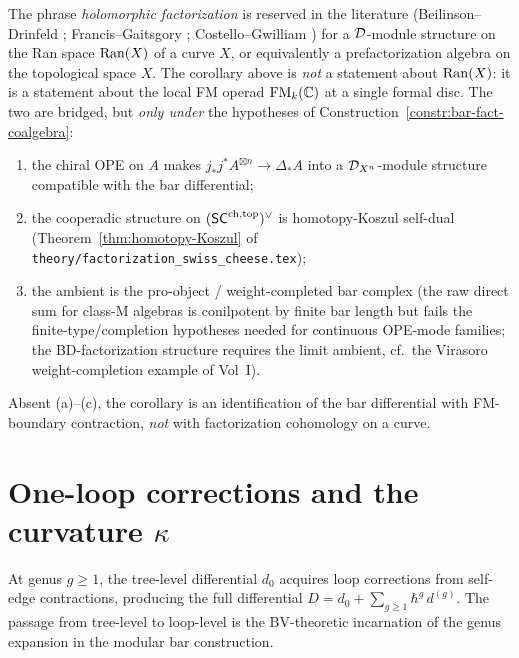 \begin{remark}
The phrase \emph{holomorphic factorization} is reserved in the
literature \textup{(}Beilinson--Drinfeld \cite{BD04};
Francis--Gaitsgory \cite{FG12}; Costello--Gwilliam
\cite{CG17,CG21}\textup{)} for a $\mathcal{D}$-module structure on
the Ran space $\operatorname{Ran}(X)$ of a curve $X$, or equivalently a
prefactorization algebra on the topological space $X$. The
corollary above is \emph{not} a statement about
$\operatorname{Ran}(X)$: it is a statement about the local FM operad
$\operatorname{FM}_k(\mathbb{C})$ at a single formal disc. The two are bridged,
but \emph{only under} the hypotheses of
Construction~\ref{constr:bar-fact-coalgebra}:
\begin{enumerate}[label=\textup{(\alph*)}]
\item the chiral OPE on $A$ makes
$j_* j^* A^{\boxtimes n} \to \Delta_* A$ into a
$\mathcal{D}_{X^n}$-module structure compatible with the bar
differential;
\item the cooperadic structure on $(\mathsf{SC}^{\mathrm{ch,top}})^{\vee}$ is
homotopy-Koszul self-dual \textup{(}Theorem~\ref{thm:homotopy-Koszul}
of \texttt{theory/factorization\_swiss\_cheese.tex}\textup{)};
\item the ambient is the pro-object /
weight-completed bar complex \textup{(}the raw direct sum for
class-M algebras is conilpotent by finite bar length but fails the
finite-type/completion hypotheses needed for continuous OPE-mode
families; the BD-factorization structure requires the limit
ambient, cf.\ the Virasoro weight-completion example of Vol~I\textup{)}.
\end{enumerate}
Absent (a)--(c), the corollary is an identification of the
bar differential with FM-boundary contraction, \emph{not} with
factorization cohomology on a curve.
\end{remark}



\section{One-loop corrections and the curvature
\texorpdfstring{$\kappa$}{kappa}}
\label{sec:thqg-bv-ext-one-loop}
At genus $g \geq 1$, the tree-level differential $d_0$ acquires
loop corrections from self-edge contractions, producing the full
differential $D = d_0 + \sum_{g \geq 1} \hbar^g\, d^{(g)}$.
The passage from tree-level to loop-level is the BV-theoretic
incarnation of the genus expansion in the modular bar construction.

